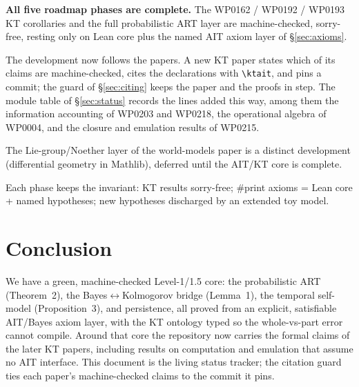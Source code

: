 \documentclass[11pt,a4paper]{article}
\newcommand{\lean}[1]{{\ttfamily\small
  \let\leanunderscore\_\def\_{\leanunderscore\allowbreak}#1}}
\newcommand{\ktait}[1]{\texttt{\small #1}}
\begin{document}
\begin{description}[leftmargin=1.4em,style=nextline]
\smallskip\noindent\textbf{All five roadmap phases are complete.} The WP0162 / WP0192 / WP0193
KT corollaries and the full probabilistic ART layer are machine-checked, \lean{sorry}-free,
resting only on Lean core plus the named AIT axiom layer of \S\ref{sec:axioms}.
\item[Since then --- paper by paper.] The development now follows the papers. A new KT paper
states which of its claims are machine-checked, cites the declarations with
\ktait{\textbackslash ktait}, and pins a commit; the guard of \S\ref{sec:citing} keeps the paper
and the proofs in step. The module table of \S\ref{sec:status} records the lines added this way,
among them the information accounting of WP0203 and WP0218, the operational algebra of WP0004,
and the closure and emulation results of WP0215.
\item[\textcolor{gray}{Later --- geometry track.}] The Lie-group/Noether layer of the world-models
paper is a distinct development (differential geometry in Mathlib), deferred until the AIT/KT core
is complete.
\end{description}

\noindent Each phase keeps the invariant: KT results \lean{sorry}-free; \lean{\#print axioms} =
Lean core + named hypotheses; new hypotheses discharged by an extended toy model.

\section{Conclusion}
We have a green, machine-checked Level-1/1.5 core: the probabilistic ART (Theorem~2), the
Bayes$\leftrightarrow$Kolmogorov bridge (Lemma~1), the temporal self-model (Proposition~3), and
persistence, all proved from an explicit, satisfiable AIT/Bayes axiom layer, with the KT ontology
typed so the whole-vs-part error cannot compile. Around that core the repository now carries the
formal claims of the later KT papers, including results on computation and emulation that assume
no AIT interface. This document is the living status tracker; the citation guard ties each
paper's machine-checked claims to the commit it pins.
\end{document}
